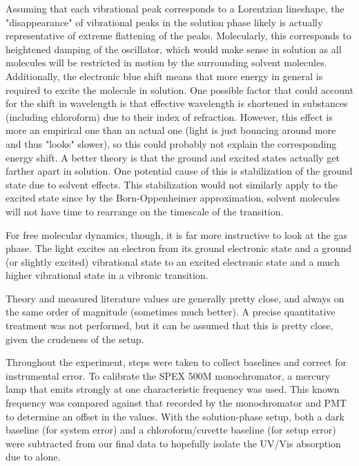 \documentclass[../labs.tex]{subfiles}
\begin{document}
Assuming that each vibrational peak corresponds to a Lorentzian lineshape, the "disappearance" of vibrational peaks in the solution phase likely is actually representative of extreme flattening of the peaks. Molecularly, this corresponds to heightened damping of the oscillator, which would make sense in solution as all  molecules will be restricted in motion by the surrounding solvent molecules. Additionally, the electronic blue shift means that more energy in general is required to excite the molecule in solution. One possible factor that could account for the shift in wavelength is that effective wavelength is shortened in substances (including chloroform) due to their index of refraction. However, this effect is more an empirical one than an actual one (light is just bouncing around more and thus "looks" slower), so this could probably not explain the corresponding energy shift. A better theory is that the ground and excited states actually get farther apart in solution. One potential cause of this is stabilization of the ground state due to solvent effects. This stabilization would not similarly apply to the excited state since by the Born-Oppenheimer approximation, solvent molecules will not have time to rearrange on the timescale of the transition.\par
For free molecular dynamics, though, it is far more instructive to look at the gas phase. The light excites an electron from its ground electronic state and a ground (or slightly excited) vibrational state to an excited electronic state and a much higher vibrational state in a vibronic transition.\par
Theory and measured literature values are generally pretty close, and always on the same order of magnitude (sometimes much better). A precise quantitative treatment was not performed, but it can be assumed that this is pretty close, given the crudeness of the setup.\par
Throughout the experiment, steps were taken to collect baselines and correct for instrumental error. To calibrate the SPEX 500M monochromator, a mercury lamp that emits strongly at one characteristic frequency was used. This known frequency was compared against that recorded by the monochromator and PMT to determine an offset in the values. With the solution-phase setup, both a dark baseline (for system error) and a chloroform/cuvette baseline (for setup error) were subtracted from our final data to hopefully isolate the UV/Vis absorption due to  alone.\par
\end{document}
